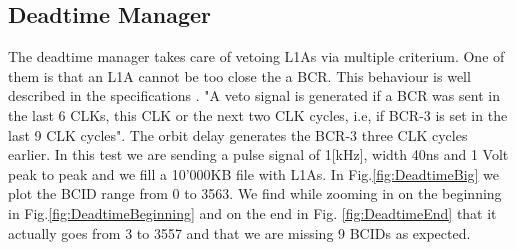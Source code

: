 \subsection{Deadtime Manager}


The deadtime manager takes care of vetoing L1As via multiple criterium. One of them is that an L1A cannot be too close the a BCR. This behaviour is well described in the specifications \cite{debieux_trigger_2019}. "A veto signal is generated if a BCR was sent in the last 6 CLKs, this CLK or the next two CLK cycles, i.e, if BCR-3 is set in the last 9 CLK cycles". The orbit delay generates the BCR-3 three CLK cycles earlier. In this test we are sending a pulse signal of 1[kHz], width 40ns and 1 Volt peak to peak and we fill a 10'000KB file with L1As. In Fig.\ref{fig:DeadtimeBig} we plot the BCID range from 0 to 3563. We find while zooming in on the beginning in Fig.\ref{fig:DeadtimeBeginning} and on the end in Fig. \ref{fig:DeadtimeEnd} that it actually goes from 3 to 3557 and that we are missing 9 BCIDs as expected.

